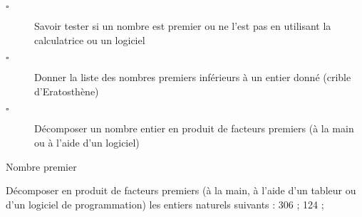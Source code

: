 \begin{titre}[Arithmétique]

\end{titre}

 

\begin{CpsCol}
\begin{description}
\item[$\square$] Savoir tester si un nombre est premier ou ne l'est pas en utilisant la calculatrice ou un logiciel
\item[$\square$] Donner la liste des nombres premiers inférieurs à un entier donné (crible d'Eratosthène)
\item[$\square$] Décomposer un nombre entier en produit de facteurs premiers (à la main ou à l'aide d'un logiciel) 
\end{description}
\end{CpsCol}




\begin{DefT}{Nombre premier}

\end{DefT}

\begin{Rq}

\end{Rq}

\begin{Ex}

\end{Ex}


Décomposer en produit de facteurs premiers (à la main, à l’aide d’un tableur ou d’un logiciel de programmation) les entiers naturels suivants : 306 ; 124 ; 







\begin{Th}

\end{Th}

\begin{Prop}

\end{Prop}

\begin{Pv}

\end{Pv}

\begin{Rq}

\end{Rq}

\begin{Ex}

\end{Ex}


